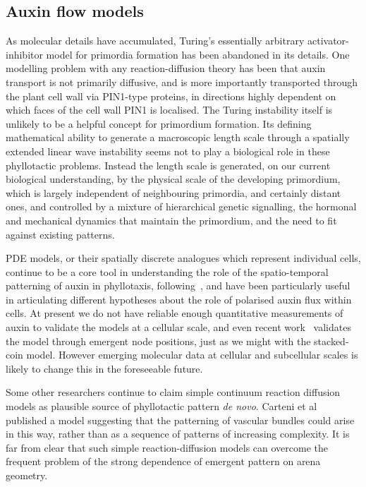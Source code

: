 \subsection{Auxin flow models}

As molecular details have accumulated, Turing's essentially arbitrary activator-inhibitor  model for primordia formation has been abandoned in its details.  One modelling problem with any reaction-diffusion theory has been that auxin transport is not primarily diffusive, and is more importantly transported through the plant cell wall via PIN1-type proteins, in directions highly dependent on which faces of the cell wall PIN1 is localised. 
The Turing instability itself  is unlikely to be a helpful concept for primordium formation. Its defining mathematical ability to generate a macroscopic length scale through a spatially extended linear wave instability seems not to play a biological role in these phyllotactic problems. Instead the length scale is generated, on our current biological understanding, by the physical scale of the developing primordium, which is largely independent of neighbouring primordia, and certainly distant ones, and controlled by a mixture of hierarchical genetic signalling,  the hormonal and mechanical dynamics that maintain the primordium, and the need to fit against existing patterns. 

PDE models, or their spatially discrete analogues which represent individual cells, continue to be a core tool in understanding the role of the spatio-temporal patterning of auxin in phyllotaxis, following~\cite{reinhardtRegulationPhyllotaxisPolar2003,smithPlausibleModelPhyllotaxis2006,jonssonAuxindrivenPolarizedTransport2006}, and have been particularly useful in articulating different hypotheses about the role of polarised auxin flux  within cells.
 At present we do not have reliable enough quantitative measurements of auxin to validate the models at a cellular scale, and 
 even recent work~\cite{pennybackerPhyllotaxisProgressStory2015} validates the model through emergent node positions, just as we might with the stacked-coin model. However emerging molecular data at cellular and subcellular scales is likely to change this in the foreseeable future.
 
Some other researchers continue to claim simple continuum reaction diffusion models as plausible source of phyllotactic pattern \textit{de novo}. Carteni et al~\autocite{carteniModellingDevelopmentArrangement2014} published a model suggesting that the patterning of vascular bundles could arise in this way, rather than as a sequence of patterns of increasing complexity. It is far from clear that such simple reaction-diffusion models can overcome the frequent problem of the strong dependence of emergent pattern on arena geometry. 


